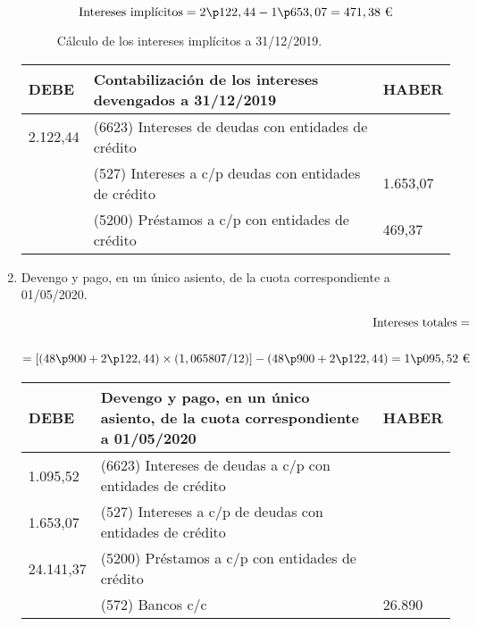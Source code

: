 \begin{enumerate}[label=\alph*)]
\begin{figure}[H]
    \begin{equation*}
        \text{Intereses implícitos} = 2\p122,44 - 1\p653,07 = 471,38 \text{ €}
    \end{equation*}
    \caption{Cálculo de los intereses implícitos a 31/12/2019.}
    \label{fig:intereses_implicitos_ejercicio4}
\end{figure}


\begin{table}[H]
\centering
\begin{tabular}{|p{2cm}|p{8cm}|p{2cm}|}
\hline
\rowcolor{blue!30}
\textbf{DEBE} & \textbf{Contabilización de los intereses devengados a 31/12/2019} & \textbf{HABER} \\ \hline
2.122,44 & (6623) Intereses de deudas con entidades de crédito & \\ \hline
& (527) Intereses a c/p deudas con entidades de crédito & 1.653,07 \\ \hline
& (5200) Préstamos a c/p con entidades de crédito & 469,37 \\ \hline
\end{tabular}
\end{table}

\item Devengo y pago, en un único asiento, de la cuota correspondiente a 01/05/2020.

\begin{align*}
    \text{Intereses totales} = \\
    \\ = \left[\left(48\p900+2\p122,44\right) \times \left(1,065807/12\right)\right] - \left(48\p900+2\p122,44\right) = 1\p095,52 \text{ €}
\end{align*}

\begin{table}[H]
\centering
\begin{tabular}{|p{2cm}|p{8cm}|p{2cm}|}
\hline
\rowcolor{blue!30}
\textbf{DEBE} & \textbf{Devengo y pago, en un único asiento, de la cuota correspondiente a 01/05/2020} & \textbf{HABER} \\ \hline
1.095,52 & (6623) Intereses de deudas a c/p con entidades de crédito & \\ \hline
1.653,07 & (527) Intereses a c/p de deudas con entidades de crédito & \\ \hline
24.141,37 & (5200) Préstamos a c/p con entidades de crédito & \\ \hline
& (572) Bancos c/c & 26.890 \\ \hline
\end{tabular}
\end{table}



\end{enumerate}
